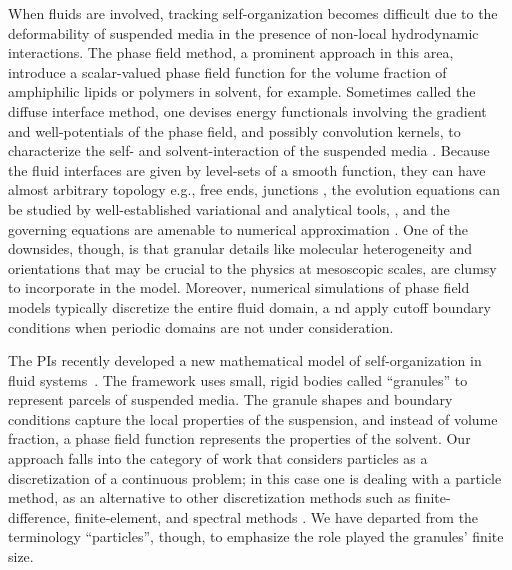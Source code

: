When fluids are involved,
tracking self-organization
becomes difficult due to the deformability of
suspended media in the presence of non-local hydrodynamic interactions.  
The phase field method,
a prominent approach in this area,
introduce a scalar-valued phase
field function for the volume fraction of
amphiphilic lipids or polymers in solvent, for example.
Sometimes called the diffuse interface
method, one devises energy functionals involving the gradient and
well-potentials of the phase field, and possibly convolution
kernels, to characterize the self- and solvent-interaction of the
suspended media 
\cite{Promislow2022UndulatedBI,C9SM01983A,doi:10.1063/5.0009734,
LiAn-Chang16,Choksi2003OnTD}.
Because the fluid interfaces are given by 
level-sets of a smooth function,
they can have almost arbitrary topology
e.g., free ends, junctions
\cite{Promislow2017ExistenceBA,Promislow2022UndulatedBI},
the evolution equations can be studied
by well-established variational and analytical tools,
\cite{Gavish2011CurvatureDF,Dai2019WeakSF,Dai2015CompetitiveGE,
Dai2022GeometricEO,Dai2020MinimizersFT,Dai2013GeometricEO},
and the governing equations are amenable to numerical approximation
\cite{Christlieb2020BenchmarkCO,Christlieb2019CompetitionAC}.
One of the downsides, though, 
is that granular details like molecular heterogeneity
and orientations that may be crucial to the physics at mesoscopic scales, are
clumsy to incorporate in the model. Moreover,
numerical simulations of
phase field models typically discretize the entire fluid domain, a
nd apply cutoff boundary conditions when periodic
domains are not under consideration. 

The PIs recently developed a new mathematical model of
self-organization in fluid systems~\cite{FuQuRyYo22,fu-ryh-qua-you2022,Fu2018_SIAM}.
The framework uses small, rigid bodies called ``granules''
to represent parcels of suspended media.
The granule shapes and boundary conditions
capture the local properties of the suspension,
and instead of volume fraction, a phase field function represents
the properties of the solvent.
Our approach falls into the category of work that considers
particles as a discretization of a continuous problem;
in this case one is dealing with a particle
method, as an alternative to other discretization methods
such as finite-difference, finite-element, and spectral methods
\cite{Wilson2021ComparisonOT}.
We have departed from the terminology
``particles'', though, to emphasize the role played the granules' finite size.


